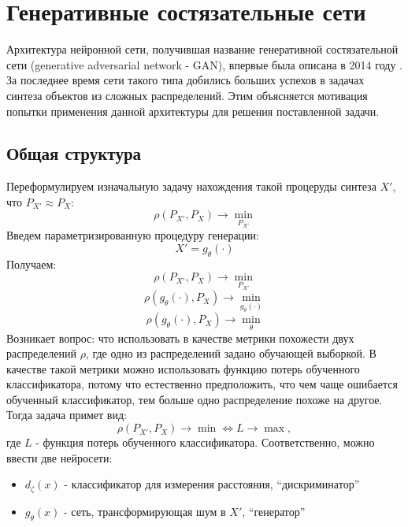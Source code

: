 \section{Генеративные состязательные сети}
	Архитектура нейронной сети, получившая название генеративной состязательной сети (generative adversarial network - GAN), впервые была описана в 2014 году \cite{GAN-original}. За последнее время сети такого типа добились больших успехов в задачах синтеза объектов из сложных распределений. Этим объясняется мотивация попытки применения данной архитектуры для решения поставленной задачи.
	\subsection{Общая структура}
		Переформулируем изначальную задачу нахождения такой процеруды синтеза $X'$, что $ P_{X'} \approx P_X$:
		$$ \rho(P_{X'}, P_X) \longrightarrow \underset{P_{X'}}{\min} $$
		Введем параметризированную процедуру генерации:
		$$ X' = g_{\theta}(\cdot) $$
		Получаем:
		$$ \rho(P_{X'}, P_X) \longrightarrow \underset{P_{X'}}{\min} $$
		$$ \rho(g_{\theta}(\cdot), P_X) \longrightarrow \underset{g_{\theta}(\cdot)}{\min} $$
		$$ \rho(g_{\theta}(\cdot), P_X) \longrightarrow \underset{\theta}{\min} $$
		Возникает вопрос: что использовать в качестве метрики похожести двух распределений $\rho$, где одно из распределений задано обучающей выборкой.
		В качестве такой метрики можно использовать функцию потерь обученного классификатора, потому что естественно предположить, что чем чаще ошибается обученный классификатор, тем больше одно распределение похоже на другое. Тогда задача примет вид:
		$$ \rho(P_{X'}, P_X) \longrightarrow \min \Leftrightarrow L \longrightarrow \max, $$
		где $L$ - функция потерь обученного классификатора.
		Соответственно, можно ввести две нейросети:
		
		\begin{itemize}
			\item $d_{\zeta}(x)$ - классификатор для измерения расстояния, ``дискриминатор''
			\item $g_{\theta}(x)$ - сеть, трансформирующая шум в $X'$, ``генератор''
		\end{itemize}
		
